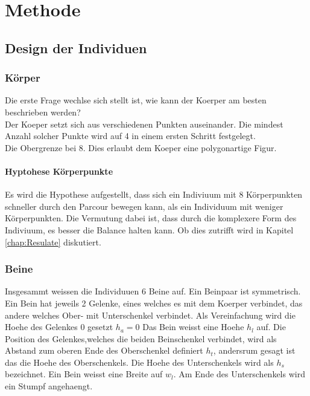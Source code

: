 %
%


\chapter{Methode}

  \section{Design der Individuen}

    \subsection{Körper}
    \label{sub:Körper}
      Die erste Frage wechlse sich stellt ist, wie kann der Koerper am besten beschrieben werden? \\
      Der Koeper setzt sich aus verschiedenen Punkten auseinander. Die mindest Anzahl solcher Punkte wird auf 4 in einem ersten Schritt festgelegt. \\
      Die Obergrenze bei 8. Dies erlaubt dem Koeper eine polygonartige Figur.
      \subsubsection{Hyptohese Körperpunkte}
      \label{subsub:hypoKp}
      Es wird die Hypothese aufgestellt, dass sich ein Indiviuum mit 8 Körperpunkten schneller durch den Parcour bewegen kann, als ein Individuum mit weniger Körperpunkten.
      Die Vermutung dabei ist, dass durch die komplexere Form des Indiviuum, es besser die Balance halten kann.
      Ob dies zutrifft wird in Kapitel \ref{chap:Resulate} diskutiert.
    \subsection {Beine}
    \label{sub:Beine}
      Insgesammt weissen die Individuuen 6 Beine auf. Ein Beinpaar ist symmetrisch. Ein Bein hat jeweils 2 Gelenke, eines welches es mit dem Koerper verbindet,
      das andere welches Ober- mit Unterschenkel verbindet. Als Vereinfachung wird die Hoehe des Gelenkes 0 gesetzt  \(h_{a} = 0\)
      Das Bein weisst eine Hoehe \(h_{l}\) auf. Die Position des Gelenkes,welches die beiden Beinschenkel verbindet,
      wird als Abstand zum oberen Ende des Oberschenkel definiert \(h_{t}\), andersrum gesagt ist das die Hoehe des Oberschenkels.
      Die Hoehe des Unterschenkels wird als \(h_{s}\) bezeichnet.
      Ein Bein weisst eine Breite auf \(w_{l}\). Am Ende des Unterschenkels wird ein Stumpf angehaengt.
